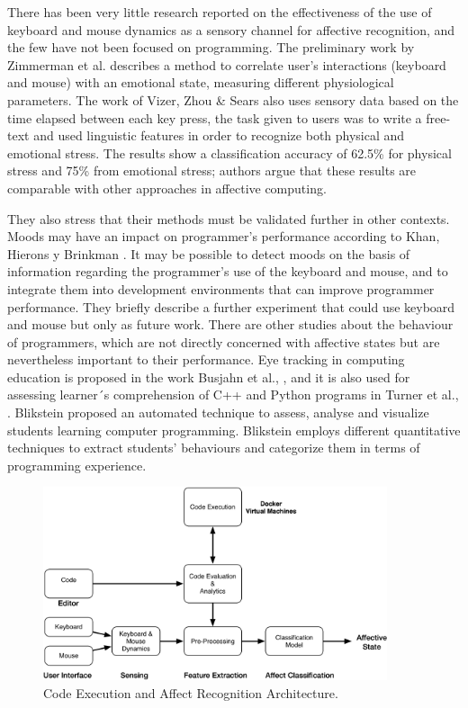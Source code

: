 \documentclass[a4paper,twoside]{article}
\begin{document}
There has been very little research reported on the effectiveness of the use of
keyboard and mouse dynamics as a sensory channel for affective recognition, and
the few have not been focused on programming. The preliminary work by Zimmerman
et al. \cite{zimmermann2003affective} describes a method to correlate user’s interactions (keyboard and
mouse) with an emotional state, measuring different physiological parameters. The work of Vizer, Zhou \& Sears \cite{vizer2009automated} also
uses sensory data based on the time elapsed between each key press, the task
given to users was to write a free-text and used linguistic features in order to
recognize both physical and emotional stress. The results show a classification
accuracy of 62.5\% for physical stress and 75\% from emotional stress; authors
argue that these results are comparable with other approaches in affective
computing.

They also stress that their methods must be validated further in
other contexts. Moods may have an impact on programmer’s performance according
to Khan, Hierons y Brinkman \cite{khan2007mood}. It may be possible to detect moods
on the basis of information regarding the programmer’s use of the keyboard and
mouse, and to integrate them into development environments that can improve
programmer performance. They briefly describe a further experiment that could
use keyboard and mouse but only as future work. There are other studies about
the behaviour of programmers, which are not directly concerned with affective
states but are nevertheless important to their performance. Eye tracking in
computing education is proposed in the work Busjahn et al., \cite{busjahn2014eye}, and it is
also used for assessing learner´s comprehension of C++ and Python programs in
Turner et al., \cite{turner2014eye}. Blikstein \cite{blikstein2011using} proposed 
an automated technique to
assess, analyse and visualize students learning computer programming. Blikstein
employs different quantitative techniques to extract students’ behaviours and
categorize them in terms of programming experience.

\begin{figure}[h!tbp] 
\centering 
\includegraphics[width=0.9\textwidth]{KMDAffective.png} 
\caption{Code Execution and Affect Recognition Architecture.}
\label{fig_process} 
\end{figure}
\end{document}
